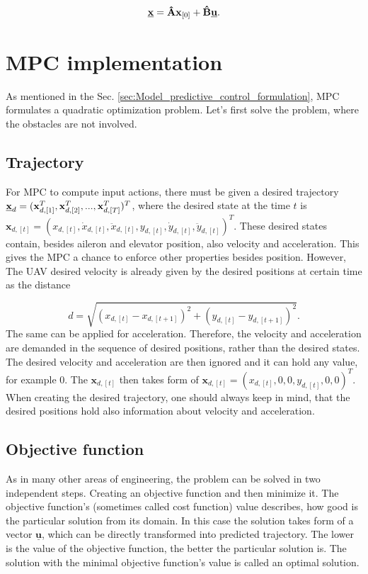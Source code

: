 \documentclass[a4paper,11pt,titlepage]{article}
\newcommand{\uvec}{\textbf{\underline{u}}}
\begin{document}
\begin{equation}
\label{eq:prediction_final}
\textbf{\underline{x}} = \textbf{\^A}\textbf{x}_{[0]} + \textbf{\^B}\uvec.
\end{equation}

\section{MPC implementation}
As mentioned in the Sec. \ref{sec:Model_predictive_control_formulation}, MPC formulates a quadratic optimization problem. Let's first solve the problem, where the obstacles are not involved. 
\subsection{Trajectory}
For MPC to compute input actions, there must be given a desired trajectory $\textbf{\underline{x}}_d = 
(\textbf{x}_{d,[1]}^T, \textbf{x}_{d,[2]}^T, ..., \textbf{x}_{d,[T]}^T)^T$, where the desired state at the time $t$ is $\textbf{x}_{d,[t]} = (x_{d,[t]}, \dot{x}_{d,[t]}, \ddot{x}_{d,[t]}, y_{d,[t]}, \dot{y}_{d,[t]}, \ddot{y}_{d,[t]})^T$. These desired states contain, besides aileron and elevator position, also velocity and acceleration. This gives the MPC a chance to  enforce other properties besides position. However, The UAV desired velocity is already given by the desired positions at certain time as the distance 

\begin{equation}
d = \sqrt{(x_{d,[t]}-x_{d,[t+1]})^2+ (y_{d,[t]}- y_{d,[t+1]})^2}.
\end{equation} 
The same can be applied for acceleration. Therefore, the velocity and acceleration are demanded in the sequence of desired positions, rather than the desired states. The desired velocity and acceleration are then ignored and it can hold any value, for example 0. The $\textbf{x}_{d,[t]}$ then takes form of $\textbf{x}_{d,[t]} = (x_{d,[t]}, 0, 0, y_{d,[t]}, 0, 0)^T$. When creating the desired trajectory, one should always keep in mind, that the desired positions hold also information about velocity and acceleration.

\subsection{Objective function}
\label{sec:objective_function}
As in many other areas of engineering, the problem can be solved in two independent steps. Creating an objective function and then minimize it. The objective function's (sometimes called cost function) value describes, how good is the particular solution from its domain. In this case the solution takes form of a vector $\underline{\textbf{u}}$, which can be directly transformed into predicted trajectory. The lower is the value of the objective function, the better the particular solution is. The solution with the minimal objective function's value is called an optimal solution.
\end{document}
